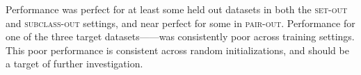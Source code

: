 

Performance was perfect for at least some held out datasets in both the \textsc{set-out} and \textsc{subclass-out} settings, and near perfect for some in \textsc{pair-out}. Performance for one of the three target datasets------was consistently poor across training settings. This poor performance is consistent across random initializations, and should be a target of further investigation. %

